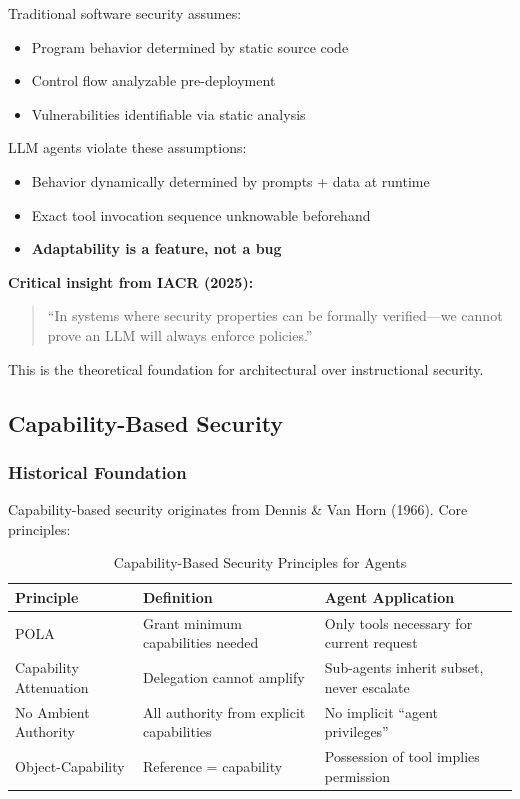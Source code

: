 Traditional software security assumes:
\begin{itemize}
    \item Program behavior determined by static source code
    \item Control flow analyzable pre-deployment
    \item Vulnerabilities identifiable via static analysis
\end{itemize}

LLM agents violate these assumptions:
\begin{itemize}
    \item Behavior dynamically determined by prompts + data at runtime
    \item Exact tool invocation sequence unknowable beforehand
    \item \textbf{Adaptability is a feature, not a bug}
\end{itemize}

\textbf{Critical insight from IACR (2025):}
\begin{quote}
``In systems where security properties can be formally verified---we cannot prove an LLM will always enforce policies.''
\end{quote}

This is the theoretical foundation for architectural over instructional security.

\subsection{Capability-Based Security}
\label{subsec:capability-security}

\subsubsection{Historical Foundation}

Capability-based security originates from Dennis \& Van Horn (1966). Core principles:

\begin{table}[htbp]
\centering
\caption{Capability-Based Security Principles for Agents}
\label{tab:capability-principles}
\begin{tabular}{lll}
\toprule
\textbf{Principle} & \textbf{Definition} & \textbf{Agent Application} \\
\midrule
POLA & Grant minimum capabilities needed & Only tools necessary for current request \\
Capability Attenuation & Delegation cannot amplify & Sub-agents inherit subset, never escalate \\
No Ambient Authority & All authority from explicit capabilities & No implicit ``agent privileges'' \\
Object-Capability & Reference = capability & Possession of tool implies permission \\
\bottomrule
\end{tabular}
\end{table}

